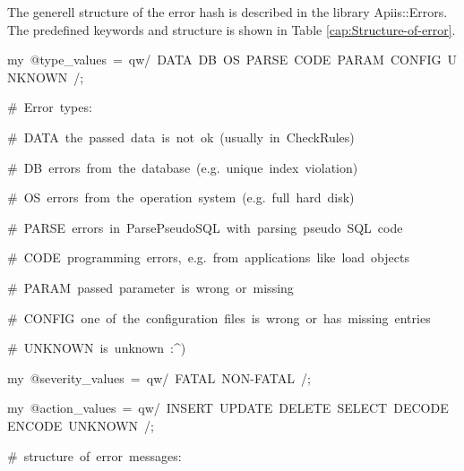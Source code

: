 The generell structure of the error hash is described in the library
Apiis::Errors. The predefined keywords and structure is shown in Table
\ref{cap:Structure-of-error}.

%
\begin{table}[htbp]

\caption{Structure of error hash\label{cap:Structure-of-error}}

\begin{lyxcode}
{\footnotesize my~@type\_values~=~qw/~DATA~DB~OS~PARSE~CODE~PARAM~CONFIG~UNKNOWN~/;~}{\footnotesize \par}

{\footnotesize \#~Error~types:~}{\footnotesize \par}

{\footnotesize \#~DATA~the~passed~data~is~not~ok~(usually~in~CheckRules)~~~~~~~~~~~~~~~~}{\footnotesize \par}

{\footnotesize \#~DB~errors~from~the~database~(e.g.~unique~index~violation)~}{\footnotesize \par}

{\footnotesize \#~OS~errors~from~the~operation~system~(e.g.~full~hard~disk)~}{\footnotesize \par}

{\footnotesize \#~PARSE~errors~in~ParsePseudoSQL~with~parsing~pseudo~SQL~code~}{\footnotesize \par}

{\footnotesize \#~CODE~programming~errors,~e.g.~from~applications~like~load~objects~}{\footnotesize \par}

{\footnotesize \#~PARAM~passed~parameter~is~wrong~or~missing~}{\footnotesize \par}

{\footnotesize \#~CONFIG~one~of~the~configuration~files~is~wrong~or~has~missing~entries~}{\footnotesize \par}

{\footnotesize \#~UNKNOWN~is~unknown~:\textasciicircum{})}{\footnotesize \par}

{\footnotesize my~@severity\_values~=~qw/~FATAL~NON-FATAL~/;~}{\footnotesize \par}

{\footnotesize my~@action\_values~=~qw/~INSERT~UPDATE~DELETE~SELECT~DECODE~ENCODE~UNKNOWN~/;}{\footnotesize \par}

{\footnotesize \#~structure~of~error~messages:}{\footnotesize \par}


\end{lyxcode}
\end{table}
